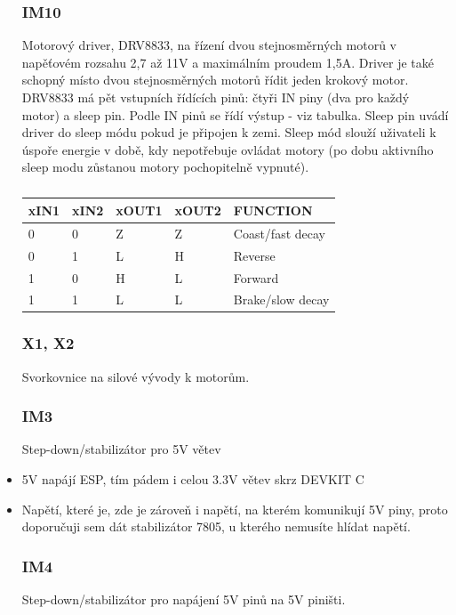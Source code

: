 \documentclass{template/socthesis}
\begin{document}
\begin{itemize}
	\subsubsection*{IM10}
	Motorový driver, DRV8833, na řízení dvou stejnosměrných motorů v napěťovém rozsahu 2,7 až 11V a maximálním proudem 1,5A. 
	Driver je také schopný místo dvou stejnosměrných motorů řídit jeden krokový motor.
	DRV8833 má pět vstupních řídících pinů: čtyři IN piny (dva pro každý motor) a sleep pin.  Podle IN pinů se řídí výstup - viz tabulka.
	Sleep pin uvádí driver do sleep módu pokud je připojen k zemi. Sleep mód slouží uživateli k úspoře energie v době, kdy nepotřebuje ovládat motory (po dobu aktivního sleep modu zůstanou motory pochopitelně vypnuté).
	
	\begin{table}[h]
		\centering
		\begin{tabular}{|l|l|l|l|l|}
			\hline
			xIN1 & xIN2 & xOUT1 & xOUT2 & FUNCTION \\ \hline
			0 & 0 & Z & Z & Coast/fast decay \\ 
			0 & 1 & L & H & Reverse \\ 
			1 & 0 & H & L & Forward \\ 
			1 & 1 & L & L & Brake/slow decay \\ 
			\hline
		\end{tabular}
		\caption{}
	\end{table}
	\newpage
	\subsubsection*{X1, X2}
	Svorkovnice na silové vývody k motorům.
	
	\subsubsection*{IM3}
	Step-down/stabilizátor pro 5V větev
	\item 5V napájí ESP, tím pádem i celou 3.3V větev skrz DEVKIT C
	\item Napětí, které je, zde je zároveň i napětí, na kterém komunikují 5V piny, proto doporučuji sem dát stabilizátor 7805, u kterého nemusíte hlídat napětí.
	
	\subsubsection*{IM4}
	Step-down/stabilizátor pro napájení 5V pinů na 5V piništi.
	

\end{itemize}
\end{document}
